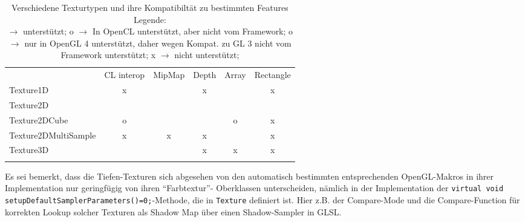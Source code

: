   	
  	\begin{table}[!h]
  		\begin{tabular}
  		{
  			|l|c|c|c|c|c|
  		}
		\noalign{\hrule}						
  						&	CL interop	&	MipMap	& Depth	&	Array	&	Rectangle	\\
  		\noalign{\hrule}						
  		Texture1D		& {\color{red}x} & {\color{green}\checkmark} & {\color{red}x}
  						& {\color{green}\checkmark} & {\color{red}x} \\
		\noalign{\hrule}						
  		Texture2D		& {\color{green}\checkmark} & {\color{green}\checkmark} & {\color{green}\checkmark}  
  						& {\color{green}\checkmark} & {\color{green}\checkmark} \\
  		\noalign{\hrule}						
  		Texture2DCube 	& {\color{yellow}o} & {\color{green}\checkmark}  & {\color{green}\checkmark}
  						& {\color{orange}o} & {\color{red}x} \\
  		\noalign{\hrule}						
  		Texture2DMultiSample& {\color{red}x} & {\color{red}x}  & {\color{red}x} 
  						& {\color{green}\checkmark} & {\color{red}x} \\	
  		\noalign{\hrule}						
  		Texture3D		& {\color{green}\checkmark} & {\color{green}\checkmark}  & {\color{red}x} 
  						& {\color{red}x} & {\color{red}x} \\
  		\noalign{\hrule}						
  		\end{tabular}
  		
  		\caption{Verschiedene Texturtypen und ihre Kompatibiltät zu bestimmten Features \\	
  			Legende: \\
			{\color{green}\checkmark}	$\rightarrow$ unterstützt;
			{\color{yellow}o}	$\rightarrow$ In OpenCL unterstützt, aber nicht vom Framework;
			{\color{orange}o}	$\rightarrow$ nur in OpenGL 4 unterstützt,
								daher wegen Kompat. zu GL 3 nicht vom Framework unterstützt;
			{\color{red}x}	$\rightarrow$ nicht unterstützt;
		}
  		\label{tab:textureTypes}
	\end{table}
	
	Es sei bemerkt, dass die Tiefen-Texturen sich abgesehen von den automatisch bestimmten
	entsprechenden OpenGL-Makros in ihrer Implementation nur geringfügig von ihren "`Farbtextur"'-
	Oberklassen unterscheiden, nämlich in der Implementation der 
	\lstinline|virtual void setupDefaultSamplerParameters()=0;|-Methode, die in \lstinline|Texture| definiert ist.
	Hier z.B. der Compare-Mode und die Compare-Function für korrekten Lookup solcher Texturen als Shadow Map
	über einen	Shadow-Sampler in GLSL.
	

